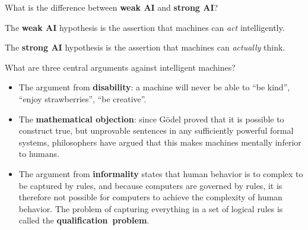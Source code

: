 
\begin{flashcard}[Question]{What is the difference between \textbf{weak AI} and \textbf{strong AI}?}
\begin{center}
The \textbf{weak AI} hypothesis is the assertion that machines can \textit{act} intelligently.

\medskip

The \textbf{strong AI} hypothesis is the assertion that machines can \textit{actually} think.
\end{center}
\end{flashcard}

\begin{flashcard}[Question]{What are three central arguments against intelligent machines?}
\begin{itemize}
\item The argument from \textbf{disability}: a machine will never be able to ``be kind'', ``enjoy strawberries'', ``be creative''.
\item The \textbf{mathematical objection}: since Gödel proved that it is possible to construct true, but unprovable sentences in any sufficiently powerful formal systems, philosophers have argued that this makes machines mentally inferior to humans.
\item The argument from \textbf{informality} states that human behavior is to complex to be captured by rules, and because computers are governed by rules, it is therefore not possible for computers to achieve the complexity of human behavior. The problem of capturing everything in a set of logical rules is called the \textbf{qualification~problem}.
\end{itemize}
\end{flashcard}

\begin{flashcard}[Question]{}
\end{flashcard}

\begin{flashcard}[Question]{}
\end{flashcard}

\begin{flashcard}[Question]{}
\end{flashcard}

\begin{flashcard}[Question]{}
\end{flashcard}

\begin{flashcard}[Question]{}
\end{flashcard}

\begin{flashcard}[Question]{}
\end{flashcard}

\begin{flashcard}[Question]{}
\end{flashcard}

\begin{flashcard}[Question]{}
\end{flashcard}

\begin{flashcard}[Question]{}
\end{flashcard}
